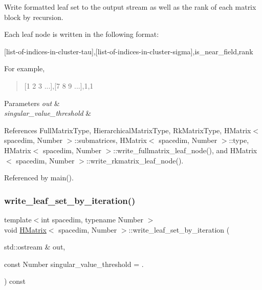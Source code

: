 Write formatted leaf set to the output stream as well as the rank of each matrix block by recursion.

Each leaf node is written in the following format\+:

\begin{quote}


\end{quote}
\mbox{[}list-\/of-\/indices-\/in-\/cluster-\/tau\mbox{]},\mbox{[}list-\/of-\/indices-\/in-\/cluster-\/sigma\mbox{]},is\+\_\+near\+\_\+field,rank

For example,

\begin{quote}
\mbox{[}1 2 3 ...\mbox{]},\mbox{[}7 8 9 ...\mbox{]},1,1 \end{quote}

\begin{DoxyParams}{Parameters}
{\em out} & \\
\hline
{\em singular\+\_\+value\+\_\+threshold} & \\
\hline
\end{DoxyParams}


References Full\+Matrix\+Type, Hierarchical\+Matrix\+Type, Rk\+Matrix\+Type, H\+Matrix$<$ spacedim, Number $>$\+::submatrices, H\+Matrix$<$ spacedim, Number $>$\+::type, H\+Matrix$<$ spacedim, Number $>$\+::write\+\_\+fullmatrix\+\_\+leaf\+\_\+node(), and H\+Matrix$<$ spacedim, Number $>$\+::write\+\_\+rkmatrix\+\_\+leaf\+\_\+node().



Referenced by main().

\mbox{\label{classHMatrix_aac1e1ddbfeb133520dcd50c0174aab8d}} 
\subsubsection{\texorpdfstring{write\+\_\+leaf\+\_\+set\+\_\+by\+\_\+iteration()}{write\_leaf\_set\_by\_iteration()}}
{\footnotesize\ttfamily template$<$int spacedim, typename Number $>$ \\
void \hyperlink{classHMatrix}{H\+Matrix}$<$ spacedim, Number $>$\+::write\+\_\+leaf\+\_\+set\+\_\+by\+\_\+iteration (\begin{DoxyParamCaption}\item[{std\+::ostream \&}]{out,  }\item[{const Number}]{singular\+\_\+value\+\_\+threshold = {.} }\end{DoxyParamCaption}) const}

